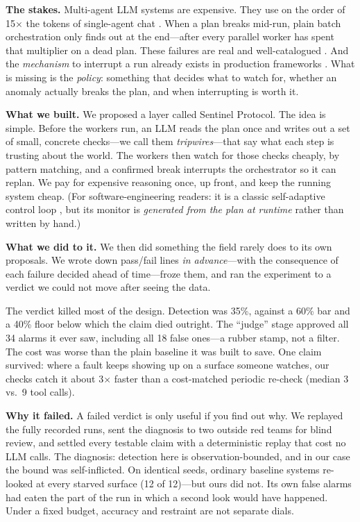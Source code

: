 \documentclass[acmsmall,screen]{acmart}
\begin{document}
\textbf{The stakes.} Multi-agent LLM systems are expensive. They use on the
order of 15$\times$ the tokens of single-agent chat \cite{ref27}. When a plan
breaks mid-run, plain batch orchestration only finds out at the end---after
every parallel worker has spent that multiplier on a dead plan. These failures
are real and well-catalogued \cite{ref14, ref16}. And the \emph{mechanism} to
interrupt a run already exists in production frameworks \cite{ref22}. What is
missing is the \emph{policy}: something that decides what to watch for, whether
an anomaly actually breaks the plan, and when interrupting is worth it.

\textbf{What we built.} We proposed a layer called Sentinel Protocol. The idea
is simple. Before the workers run, an LLM reads the plan once and writes out a
set of small, concrete checks---we call them \emph{tripwires}---that say what
each step is trusting about the world. The workers then watch for those checks
cheaply, by pattern matching, and a confirmed break interrupts the orchestrator
so it can replan. We pay for expensive reasoning once, up front, and keep the
running system cheap. (For software-engineering readers: it is a classic
self-adaptive control loop \cite{ref23}, but its monitor is \emph{generated
from the plan at runtime} rather than written by hand.)

\textbf{What we did to it.} We then did something the field rarely does to its
own proposals. We wrote down pass/fail lines \emph{in advance}---with the
consequence of each failure decided ahead of time---froze them, and ran the
experiment to a verdict we could not move after seeing the data.

The verdict killed most of the design. Detection was 35\%, against a 60\% bar
and a 40\% floor below which the claim died outright. The ``judge'' stage
approved all 34 alarms it ever saw, including all 18 false ones---a rubber
stamp, not a filter. The cost was worse than the plain baseline it was built to
save. One claim survived: where a fault keeps showing up on a surface someone
watches, our checks catch it about 3$\times$ faster than a cost-matched
periodic re-check (median 3 vs.\ 9 tool calls).

\textbf{Why it failed.} A failed verdict is only useful if you find out why. We
replayed the fully recorded runs, sent the diagnosis to two outside red teams
for blind review, and settled every testable claim with a deterministic replay
that cost no LLM calls. The diagnosis: detection here is observation-bounded,
and in our case the bound was self-inflicted. On identical seeds, ordinary
baseline systems re-looked at every starved surface (12 of 12)---but ours did
not. Its own false alarms had eaten the part of the run in which a second look
would have happened. Under a fixed budget, accuracy and restraint are not
separate dials.
\end{document}
